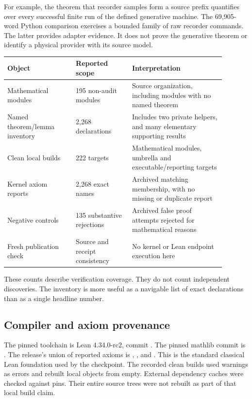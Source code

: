 \documentclass[11pt]{article}
\begin{document}
For example, the theorem that recorder samples form a source prefix quantifies
over every successful finite run of the defined generative machine. The
69,905-word Python comparison exercises a bounded family of raw recorder
commands. The latter provides adapter evidence. It does not prove the
generative theorem or identify a physical provider with its source model.

\begin{center}
\begin{tabular}{p{0.28\linewidth}p{0.23\linewidth}p{0.38\linewidth}}
\toprule
Object & Reported scope & Interpretation\\
\midrule
Mathematical modules & 195 non-audit modules & Source organization, including modules with no named theorem\\
Named theorem/lemma inventory & 2,268 declarations & Includes two private helpers, and many elementary supporting results\\
Clean local builds & 222 targets & Mathematical modules, umbrella and executable/reporting targets\\
Kernel axiom reports & 2,268 exact names & Archived matching membership, with no missing or duplicate report\\
Negative controls & 135 substantive rejections & Archived false proof attempts rejected for mathematical reasons\\
Fresh publication check & Source and receipt consistency & No kernel or Lean endpoint execution here\\
\bottomrule
\end{tabular}
\end{center}

These counts describe verification coverage. They do not count independent
discoveries. The inventory is more useful as a navigable list of exact
declarations than as a single headline number.

\subsection{Compiler and axiom provenance}
The pinned toolchain is Lean 4.34.0-rc2, commit
. The pinned mathlib commit is
. The release's union of reported
axioms is , , and .
This is the standard classical Lean foundation used by the checkpoint.
The recorded clean builds used warnings as errors and rebuilt local objects
from empty. External dependency caches were checked against pins. Their entire
source trees were not rebuilt as part of that local build claim.
\end{document}
